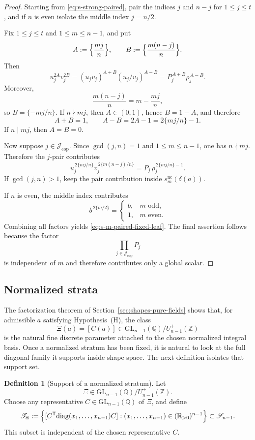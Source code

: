 \documentclass[11pt,letterpaper]{amsart}
\newcommand{\Q}{\mathbb{Q}}
\newcommand{\Z}{\mathbb{Z}}
\newcommand{\R}{\mathbb{R}}
\newcommand{\GL}{\mathrm{GL}}
\newcommand{\diag}{\mathrm{diag}}
\theoremstyle{plain}
\theoremstyle{definition}
\newtheorem{definition}[theorem]{Definition}
\begin{document}
\begin{proof}
Starting from \eqref{eq:s-strong-paired}, pair the indices \(j\) and \(n-j\)
for \(1\le j\le t\), and if \(n\) is even isolate the middle index \(j=n/2\).

Fix \(1\le j\le t\) and \(1\le m\le n-1\), and put
\[
A:=\Bigl\{\frac{mj}{n}\Bigr\},
\qquad
B:=\Bigl\{\frac{m(n-j)}{n}\Bigr\}.
\]
Then
\[
u_j^{2A}v_j^{2B}
=
(u_jv_j)^{A+B}(u_j/v_j)^{A-B}
=
P_j^{\,A+B}\rho_j^{\,A-B}.
\]
Moreover,
\[
\frac{m(n-j)}{n}=m-\frac{mj}{n},
\]
so \(B=\{-mj/n\}\).  If \(n\nmid mj\), then \(A\in (0,1)\), hence \(B=1-A\),
and therefore
\[
A+B=1,
\qquad
A-B=2A-1=2\{mj/n\}-1.
\]
If \(n\mid mj\), then \(A=B=0\).

Now suppose \(j\in \mathcal J_{\mathrm{cop}}\). Since \(\gcd(j,n)=1\) and
\(1\le m\le n-1\), one has \(n\nmid mj\). Therefore the \(j\)-pair contributes
\[
u_j^{\,2\{mj/n\}}v_j^{\,2\{m(n-j)/n\}}
=
P_j\,\rho_j^{\,2\{mj/n\}-1}.
\]
If \(\gcd(j,n)>1\), keep the pair contribution inside
\(s_m^{\mathrm{nc}}(\delta(a))\).

If \(n\) is even, the middle index contributes
\[
b^{\,2\{m/2\}}
=
\begin{cases}
b,& m\text{ odd},\\
1,& m\text{ even}.
\end{cases}
\]
Combining all factors yields \eqref{eq:s-m-paired-fixed-leaf}.  The final
assertion follows because the factor
\[
\prod_{j\in \mathcal J_{\mathrm{cop}}}P_j
\]
is independent of \(m\) and therefore contributes only a global scalar.
\end{proof}

\subsection{Normalized strata}

The factorization theorem of Section~\ref{sec:shapes-pure-fields} shows that,
for admissible \(a\) satisfying Hypothesis~\textup{(H)}, the class
\[
\Xi(a)=[C(a)]\in \GL_{n-1}(\Q)/U_{n-1}^+(\Z)
\]
is the natural fine discrete parameter attached to the chosen normalized
integral basis. Once a normalized stratum has been fixed, it is natural to look at the full diagonal family it supports inside shape space. The next definition isolates that support set.

\begin{definition}[Support of a normalized stratum]
\label{def:translated-diagonal-stratum}
Let
\[
\Xi\in \GL_{n-1}(\Q)/U_{n-1}^+(\Z).
\]
Choose any representative \(C\in \GL_{n-1}(\Q)\) of \(\Xi\), and define
\[
\mathscr T_{\Xi}
:=
\Bigl\{
[C^{\mathsf T}\diag(x_1,\dots,x_{n-1})C]:
(x_1,\dots,x_{n-1})\in (\R_{>0})^{n-1}
\Bigr\}
\subset \mathscr S_{n-1}.
\]
This subset is independent of the chosen representative \(C\).
\end{definition}
\end{document}
